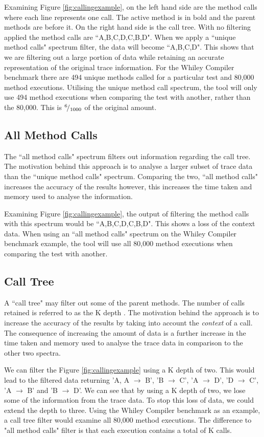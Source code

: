 Examining Figure \ref{fig:callingexample}, on the left hand side are the method calls where each line represents one call. The active method is in bold and the parent methods are before it. On the right hand side is the call tree. With no filtering applied the method calls are ``A,B,C,D,C,B,D". When we apply a ``unique method calls" spectrum filter, the data will become ``A,B,C,D". This shows that we are filtering out a large portion of data while retaining an accurate representation of the original trace information. For the Whiley Compiler benchmark there are 494 unique methods called for a particular test and 80,000 method executions. Utilising the unique method call spectrum, the tool will only use 494 method executions when comparing the test with another, rather than the 80,000. This is ${}^{6}\!/_{1000}$ of the original amount. 

\subsection{All Method Calls}
The ``all method calls" spectrum filters out information regarding the call tree. The motivation behind this approach is to analyse a larger subset of trace data than the ``unique method calls" spectrum. Comparing the two, ``all method calls" increases the accuracy of the results however, this increases the time taken and memory used to analyse the information.

Examining Figure \ref{fig:callingexample}, the output of filtering the method calls with this spectrum would be ``A,B,C,D,C,B,D". This shows a loss of the context data. When using an ``all method calls" spectrum on the Whiley Compiler benchmark example, the tool will use all 80,000 method executions when comparing the test with another.

\subsection{Call Tree}
A ``call tree" may filter out some of the parent methods. The number of calls retained is referred to as the K depth \cite{Zhuang06accurate}. The motivation behind the approach is to increase the accuracy of the results by taking into account the \textit{context} of a call. The consequence of increasing the amount of data is a further increase in the time taken and memory used to analyse the trace data in comparison to the other two spectra.

We can filter the Figure \ref{fig:callingexample} using a K depth of two. This would lead to the filtered data returning 'A, A $\rightarrow$ B', 'B $\rightarrow$ C', 'A $\rightarrow$ D', 'D $\rightarrow$ C', 'A $\rightarrow$ B' and 'B $\rightarrow$ D'. We can see that by using a K depth of two, we lose some of the information from the trace data. To stop this loss of data, we could extend the depth to three. Using the Whiley Compiler benchmark as an example, a call tree filter would examine all 80,000 method executions. The difference to "all method calls" filter is that each execution contains a total of K calls.

